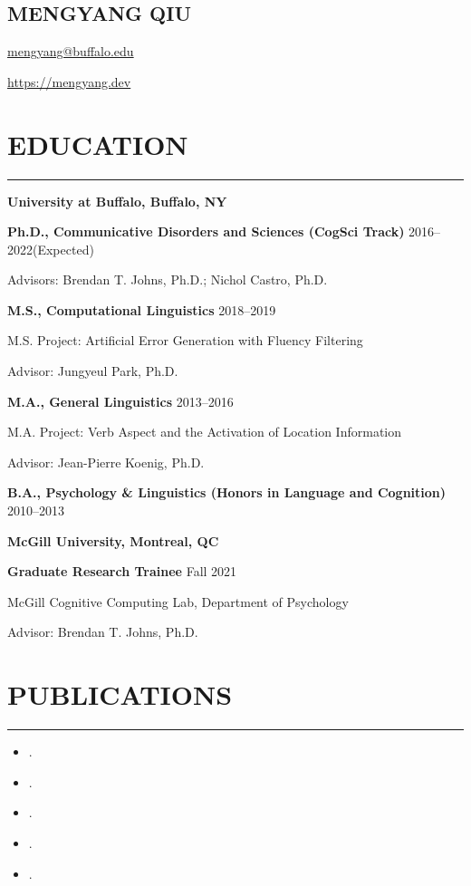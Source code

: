 \documentclass[11pt]{article}
\newcommand{\name}[1]{\begin{center}\section*{\Huge #1}\end{center}}
\newcommand{\topinfo}[1]{\begin{center}\vspace{-0.2cm}#1\vspace{-0.2cm}\end{center}}
\newcommand{\cvsection}[1]{\vspace{-0.2cm}\section*{\Large #1}\vspace{-0.2cm}\hrule\vspace{0.2cm}}
\newcommand{\h}[1]{\hspace{15pt} #1}
\begin{document}
\name{MENGYANG QIU}
\topinfo{\href{mailto:mengyang@buffalo.edu}{mengyang@buffalo.edu}}
\topinfo{\url{https://mengyang.dev}}



\cvsection{EDUCATION}

\textbf{\large University at Buffalo, Buffalo, NY}

\textbf{Ph.D., Communicative Disorders and Sciences (CogSci Track)} \hfill 2016--2022(Expected)

\h{Advisors: Brendan T. Johns, Ph.D.; Nichol Castro, Ph.D.}

\textbf{M.S., Computational Linguistics} \hfill 2018--2019

\h{M.S. Project: Artificial Error Generation with Fluency Filtering}

\h{Advisor: Jungyeul Park, Ph.D.}

\textbf{M.A., General Linguistics} \hfill 2013--2016

\h{M.A. Project: Verb Aspect and the Activation of Location Information}

\h{Advisor: Jean-Pierre Koenig, Ph.D.}

\textbf{B.A., Psychology \& Linguistics (Honors in Language and Cognition)} \hfill 2010--2013

\bigskip

\textbf{\large McGill University, Montreal, QC}

\textbf{Graduate Research Trainee} \hfill Fall 2021

\h{McGill Cognitive Computing Lab, Department of Psychology}

\h{Advisor: Brendan T. Johns, Ph.D.}

\cvsection{PUBLICATIONS}

\begin{itemize}[leftmargin=!,labelindent=!,itemindent=-18pt]
    \setlength\itemsep{0.3em}

    \item[] .
    \item[] .
    \item[] .
    \item[] .
    \item[] .

\end{itemize}
\end{document}
